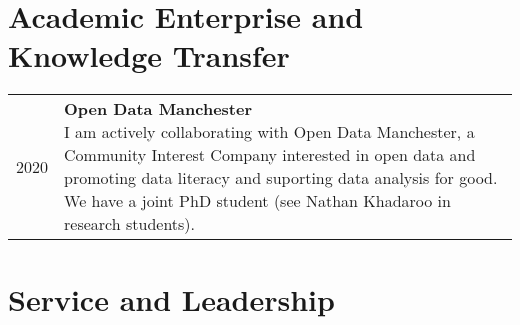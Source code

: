 \documentclass[10pt,a4paper,]{article}
\makeatletter
\newcounter{papers}
\def\briefitem#1#2#3{
#2 & \parbox[t]{0.85\textwidth}{%
      \textbf{#1}\\[-0.1cm]{\footnotesize #3}}\\[0.4cm]}
\def\briefsection#1{\begin{longtable}{@{\extracolsep{\fill}}ll}#1\end{longtable}}
\makeatother
\begin{document}
\hypertarget{academic-enterprise-and-knowledge-transfer}{%
\section{Academic Enterprise and Knowledge Transfer}\label{academic-enterprise-and-knowledge-transfer}}

\briefsection{\briefitem{Open Data Manchester}{2020}{I am actively collaborating with Open Data Manchester, a Community Interest Company interested in open data and promoting data literacy and suporting data analysis for good. We have a joint PhD student (see Nathan Khadaroo in research students).}\briefitem{Wirral Hospitals' School}{2020}{One-hour career oriented session about data analysis for students enrolled in a community school, introducing them to crime analysis.}\briefitem{Greater Manchester Police}{2019}{Co-supervision of PhD student with Greater Manchester Police's Force Intelligence Bureau and colleagues in University College London working to improve horizon scanning processes within the organisation and wider in policing.}\briefitem{N8 Analyst Training}{2018}{Training workshop on data visualisation and GIS as part of the N8 Policing Research Partnership training course for police analysts from across northern police forces.}\briefitem{Representation of women in data roles}{NA}{I consistently give talks and participate in data-related meetups including ones which emphasise representation of women in data roles, such as R-ladies and Her+Data meetups.}\briefitem{TicTec2018}{NA}{The NGO `MySociety' invited me to present the work I did using their fix my street platform at the international civic technology conference for researchers, practitioners, and all those with an interest in how technology is changing the way we engage with society. TICTeC is known for its unique focus on the impacts of Civic Technologies where funders mix with practitioners, activists converse with researchers, small NGOs get as much attention as the big players. Since then, I have been working with their research team, who have replicated findings in two of my papers, and are in the process of further joint working.}}

\hypertarget{service-and-leadership}{%
\section{Service and Leadership}\label{service-and-leadership}}
\end{document}
